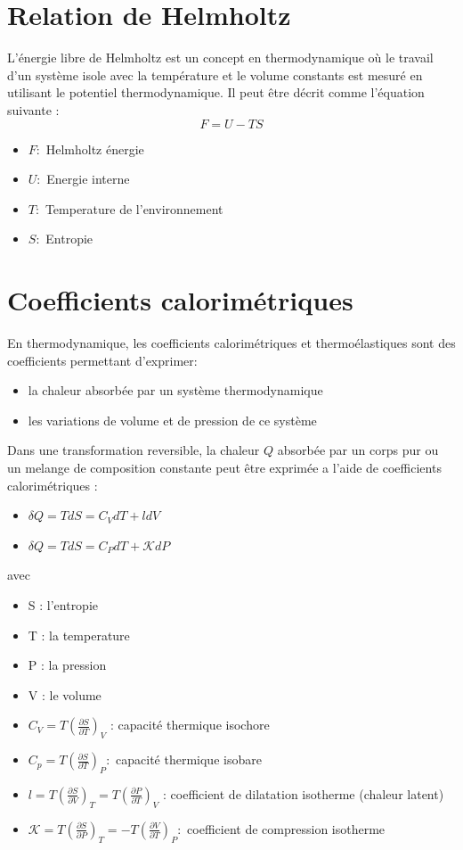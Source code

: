\documentclass[12pt,oneside]{book}
\begin{document}
\section{Relation de Helmholtz}
L'énergie libre de Helmholtz est un concept en thermodynamique où le travail d'un système isole avec la température et le volume constants est mesuré en utilisant le potentiel thermodynamique. Il peut être décrit comme l'équation suivante :
\[ F = U -TS \]
\begin{itemize}
    \item $F :$ Helmholtz énergie
    \item $U :$ Energie interne
    \item $T :$ Temperature de l’environnement
    \item $S :$ Entropie
\end{itemize}
\section{Coefficients calorimétriques}
En thermodynamique, les coefficients calorimétriques et thermoélastiques sont des coefficients permettant d'exprimer:
\begin{itemize}
    \item la chaleur absorbée par un système thermodynamique
    \item les variations de volume et de pression de ce système
\end{itemize}
Dans une transformation reversible, la chaleur $Q$ absorbée par un corps pur ou un melange de composition constante peut être exprimée a l'aide de coefficients calorimétriques :
\begin{itemize}
    \item $\delta Q = TdS = C_VdT + ldV$
    \item $\delta Q = TdS = C_PdT + \mathcal{K}dP$
\end{itemize}
avec \begin{itemize}
    \item S : l'entropie
    \item T : la temperature
    \item P : la pression
    \item V : le volume
    \item $C_V =T(\frac{\partial S}{\partial T})_V $ : capacité thermique isochore
    \item $C_p = T(\frac{\partial S}{\partial T})_P:$ capacité thermique isobare
    \item $l = T(\frac{\partial S}{\partial V})_T=T(\frac{\partial P}{\partial T})_V$ : coefficient de dilatation isotherme (chaleur latent)
    \item $\mathcal{K} = T (\frac{\partial S}{\partial P})_T = -T(\frac{\partial V}{\partial T})_P:$ coefficient de compression isotherme
\end{itemize}
\end{document}
